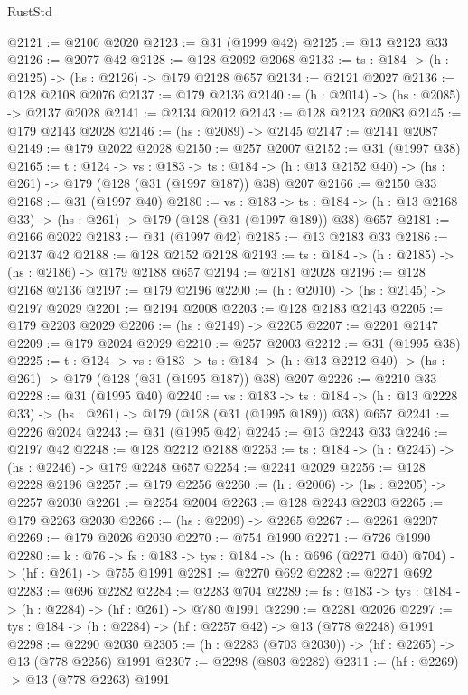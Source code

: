 \begin{lexlean}{RustStd}
\begin{coremodule}
{\begin{coremodule}
{{{{{@2121 := @2106 @2020
@2123 := @31 (@1999 @42)
@2125 := @13 @2123 @33
@2126 := @2077 @42
@2128 := @128 @2092 @2068
@2133 := {ts : @184} -> (h : @2125) -> (hs : @2126) -> @179 @2128 @657
@2134 := @2121 @2027
@2136 := @128 @2108 @2076
@2137 := @179 @2136
@2140 := (h : @2014) -> (hs : @2085) -> @2137 @2028
@2141 := @2134 @2012
@2143 := @128 @2123 @2083
@2145 := @179 @2143 @2028
@2146 := (hs : @2089) -> @2145
@2147 := @2141 @2087
@2149 := @179 @2022 @2028
@2150 := @257 @2007
@2152 := @31 (@1997 @38)
@2165 := {t : @124} ->
  {vs : @183} ->
  {ts : @184} -> (h : @13 @2152 @40) -> (hs : @261) -> @179 (@128 (@31 (@1997 @187)) @38) @207
@2166 := @2150 @33
@2168 := @31 (@1997 @40)
@2180 := {vs : @183} ->
  {ts : @184} -> (h : @13 @2168 @33) -> (hs : @261) -> @179 (@128 (@31 (@1997 @189)) @38) @657
@2181 := @2166 @2022
@2183 := @31 (@1997 @42)
@2185 := @13 @2183 @33
@2186 := @2137 @42
@2188 := @128 @2152 @2128
@2193 := {ts : @184} -> (h : @2185) -> (hs : @2186) -> @179 @2188 @657
@2194 := @2181 @2028
@2196 := @128 @2168 @2136
@2197 := @179 @2196
@2200 := (h : @2010) -> (hs : @2145) -> @2197 @2029
@2201 := @2194 @2008
@2203 := @128 @2183 @2143
@2205 := @179 @2203 @2029
@2206 := (hs : @2149) -> @2205
@2207 := @2201 @2147
@2209 := @179 @2024 @2029
@2210 := @257 @2003
@2212 := @31 (@1995 @38)
@2225 := {t : @124} ->
  {vs : @183} ->
  {ts : @184} -> (h : @13 @2212 @40) -> (hs : @261) -> @179 (@128 (@31 (@1995 @187)) @38) @207
@2226 := @2210 @33
@2228 := @31 (@1995 @40)
@2240 := {vs : @183} ->
  {ts : @184} -> (h : @13 @2228 @33) -> (hs : @261) -> @179 (@128 (@31 (@1995 @189)) @38) @657
@2241 := @2226 @2024
@2243 := @31 (@1995 @42)
@2245 := @13 @2243 @33
@2246 := @2197 @42
@2248 := @128 @2212 @2188
@2253 := {ts : @184} -> (h : @2245) -> (hs : @2246) -> @179 @2248 @657
@2254 := @2241 @2029
@2256 := @128 @2228 @2196
@2257 := @179 @2256
@2260 := (h : @2006) -> (hs : @2205) -> @2257 @2030
@2261 := @2254 @2004
@2263 := @128 @2243 @2203
@2265 := @179 @2263 @2030
@2266 := (hs : @2209) -> @2265
@2267 := @2261 @2207
@2269 := @179 @2026 @2030
@2270 := @754 @1990
@2271 := @726 @1990
@2280 := {k : @76} ->
  {fs : @183} -> {tys : @184} -> (h : @696 (@2271 @40) @704) -> (hf : @261) -> @755 @1991
@2281 := @2270 @692
@2282 := @2271 @692
@2283 := @696 @2282
@2284 := @2283 @704
@2289 := {fs : @183} -> {tys : @184} -> (h : @2284) -> (hf : @261) -> @780 @1991
@2290 := @2281 @2026
@2297 := {tys : @184} -> (h : @2284) -> (hf : @2257 @42) -> @13 (@778 @2248) @1991
@2298 := @2290 @2030
@2305 := (h : @2283 (@703 @2030)) -> (hf : @2265) -> @13 (@778 @2256) @1991
@2307 := @2298 (@803 @2282)
@2311 := (hf : @2269) -> @13 (@778 @2263) @1991
}}}}}
\end{coremodule}}
\end{coremodule}
\end{lexlean}
